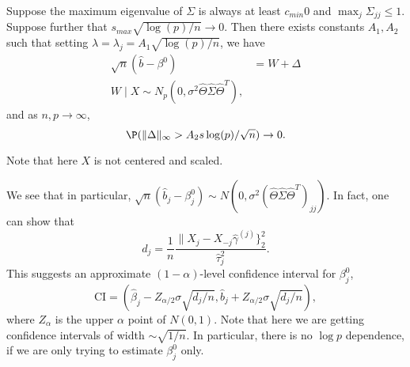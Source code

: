 \documentclass[a4paper]{article}
\begin{document}
\begin{thm}
  Suppose the maximum eigenvalue of $\Sigma$ is always at least $c_{min} 0$ and $\max_j \Sigma_{jj} \leq 1$. Suppose further that $s_{max} \sqrt{\log (p)/n} \to 0$. Then there exists constants $A_1, A_2$ such that setting $\lambda = \lambda_j = A_1 \sqrt{\log(p) /n}$, we have
  \begin{align*}
    \sqrt{n} (\hat{b} - \beta^0) &= W + \Delta\\
    W\mid X \sim N_p(0, \sigma^2 \hat{\Theta} \hat{\Sigma} \hat{\Theta}^T),
  \end{align*}
  and as $n, p \to \infty$,
  \[
    \P(\|\Delta\|_\infty > A_2 s \log(p)/\sqrt{n}) \to 0.
  \]
\end{thm}
Note that here $X$ is not centered and scaled.

We see that in particular, $\sqrt{n}(\hat{b}_j - \beta_j^0) \sim N(0, \sigma^2(\hat{\Theta} \hat{\Sigma} \hat{\Theta}^T)_{jj})$. In fact, one can show that
\[
  d_j = \frac{1}{n} \frac{\|X_j - X_{-j} \hat{\gamma}^{(j)}\}_2^2}{\hat{\tau}_j^2}.
\]
This suggests an approximate $(1 - \alpha)$-level confidence interval for $\beta^0_j$,
\[
  \mathrm{CI} = (\hat{\beta}_j - Z_{\alpha/2} \sigma \sqrt{d_j/n}, \hat{b}_j + Z_{\alpha/2} \sigma \sqrt{d_j/n}),
\]
where $Z_\alpha$ is the upper $\alpha$ point of $N(0, 1)$. Note that here we are getting confidence intervals of width $\sim \sqrt{1/n}$. In particular, there is no $\log p$ dependence, if we are only trying to estimate $\beta^0_j$ only.
\end{document}
